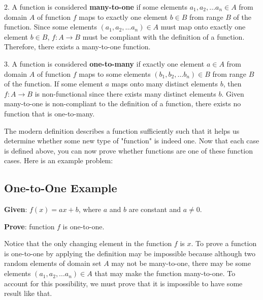 2.  A function is considered \textbf{many-to-one} if some elements $a _{1},a _{2},\ldots a
_{n}\in A$ from domain $A$ of function $f$ maps to exactly one element $b\in B$ from range
$B$ of the function. Since some elements $\left( a _{1},a _{2},\ldots a _{n} \right)\in A$
must map onto exactly one element $b\in B$, $f:A\to B$ must be compliant with the
definition of a function. Therefore, there exists a many-to-one function.

3.  A function is considered \textbf{one-to-many} if exactly one element $a\in A$ from
domain $A$ of function $f$ maps to some elements $\left( b _{1},b _{2},\ldots b _{n}
\right)\in B$ from range $B$ of the function. If some element $a$ maps onto many distinct
elements $b$, then $f:A\to B$ is non-functional since there exists many distinct elements
$b$. Given many-to-one is non-compliant to the definition of a function, there exists no
function that is one-to-many.



The modern definition describes a function sufficiently such that it helps us determine
whether some new type of "function" is indeed one. Now that each case is defined above,
you can now prove whether functions are one of these function cases. Here is an example
problem:




\subsection{One-to-One Example}
\label{sss:onet-5bc6}




\textbf{Given}: $f(x)=ax+b$, where $a$ and $b$ are constant and $a\ne0$.



\textbf{Prove}: function $f$ is one-to-one.



Notice that the only changing element in the function $f$ is $x$. To prove a function is
one-to-one by applying the definition may be impossible because although two random
elements of domain set $A$ may not be many-to-one, there may be some elements $\left( a
_{1},a _{2},\ldots a _{n} \right)\in A$ that may make the function many-to-one. To account
for this possibility, we must prove that it is impossible to have some result like that.



